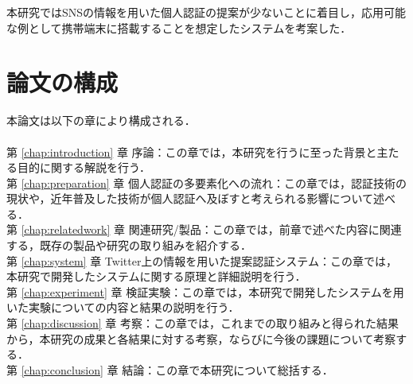 本研究ではSNSの情報を用いた個人認証の提案が少ないことに着目し，応用可能な例として携帯端末に搭載することを想定したシステムを考案した．

\newpage

\section{論文の構成}
本論文は以下の章により構成される．\\
\\
第 \ref{chap:introduction} 章 序論：この章では，本研究を行うに至った背景と主たる目的に関する解説を行う．\\
第 \ref{chap:preparation} 章 個人認証の多要素化への流れ：この章では，認証技術の現状や，近年普及した技術が個人認証へ及ぼすと考えられる影響について述べる．\\
第 \ref{chap:relatedwork} 章 関連研究/製品：この章では，前章で述べた内容に関連する，既存の製品や研究の取り組みを紹介する．\\
第 \ref{chap:system} 章 Twitter上の情報を用いた提案認証システム：この章では，本研究で開発したシステムに関する原理と詳細説明を行う．\\
第 \ref{chap:experiment} 章 検証実験：この章では，本研究で開発したシステムを用いた実験についての内容と結果の説明を行う．\\
第 \ref{chap:discussion} 章 考察：この章では，これまでの取り組みと得られた結果から，本研究の成果と各結果に対する考察，ならびに今後の課題について考察する．\\
第 \ref{chap:conclusion} 章 結論：この章で本研究について総括する．\\

\newpage

